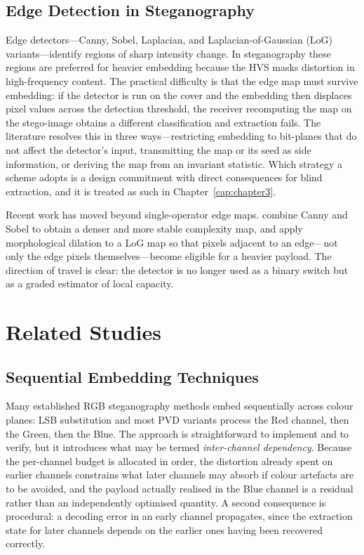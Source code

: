 \subsection{Edge Detection in Steganography}
Edge detectors---Canny, Sobel, Laplacian, and Laplacian-of-Gaussian (LoG) variants---identify regions of sharp intensity change. In steganography these regions are preferred for heavier embedding because the HVS masks distortion in high-frequency content. The practical difficulty is that the edge map must survive embedding: if the detector is run on the cover and the embedding then displaces pixel values across the detection threshold, the receiver recomputing the map on the stego-image obtains a different classification and extraction fails. The literature resolves this in three ways---restricting embedding to bit-planes that do not affect the detector's input, transmitting the map or its seed as side information, or deriving the map from an invariant statistic. Which strategy a scheme adopts is a design commitment with direct consequences for blind extraction, and it is treated as such in Chapter~\ref{cap:chapter3}.

Recent work has moved beyond single-operator edge maps. \citet{ismail2026edgeadaptive} combine Canny and Sobel to obtain a denser and more stable complexity map, and \citet{patwari2025dilatedlog} apply morphological dilation to a LoG map so that pixels adjacent to an edge---not only the edge pixels themselves---become eligible for a heavier payload. The direction of travel is clear: the detector is no longer used as a binary switch but as a graded estimator of local capacity.

\section{Related Studies} \label{sec:ch2-studies}

\subsection{Sequential Embedding Techniques}
Many established RGB steganography methods embed sequentially across colour planes: LSB substitution and most PVD variants process the Red channel, then the Green, then the Blue. The approach is straightforward to implement and to verify, but it introduces what may be termed \textit{inter-channel dependency}. Because the per-channel budget is allocated in order, the distortion already spent on earlier channels constrains what later channels may absorb if colour artefacts are to be avoided, and the payload actually realised in the Blue channel is a residual rather than an independently optimised quantity. A second consequence is procedural: a decoding error in an early channel propagates, since the extraction state for later channels depends on the earlier ones having been recovered correctly.

